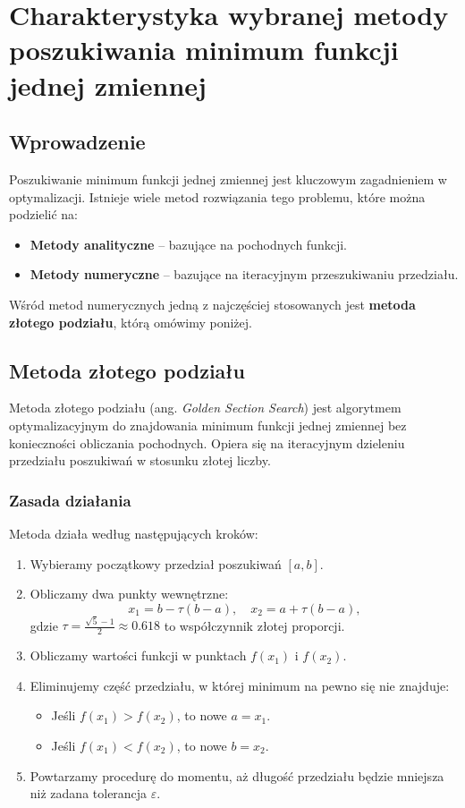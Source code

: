 \section{Charakterystyka wybranej metody poszukiwania minimum funkcji jednej zmiennej}

\subsection{Wprowadzenie}
Poszukiwanie minimum funkcji jednej zmiennej jest kluczowym zagadnieniem w optymalizacji. Istnieje wiele metod rozwiązania tego problemu, które można podzielić na:
\begin{itemize}
    \item \textbf{Metody analityczne} – bazujące na pochodnych funkcji.
    \item \textbf{Metody numeryczne} – bazujące na iteracyjnym przeszukiwaniu przedziału.
\end{itemize}

Wśród metod numerycznych jedną z najczęściej stosowanych jest \textbf{metoda złotego podziału}, którą omówimy poniżej.

\subsection{Metoda złotego podziału}
Metoda złotego podziału (ang. \textit{Golden Section Search}) jest algorytmem optymalizacyjnym do znajdowania minimum funkcji jednej zmiennej bez konieczności obliczania pochodnych. Opiera się na iteracyjnym dzieleniu przedziału poszukiwań w stosunku złotej liczby.

\subsubsection{Zasada działania}
Metoda działa według następujących kroków:

\begin{enumerate}
    \item Wybieramy początkowy przedział poszukiwań \([a, b]\).
    \item Obliczamy dwa punkty wewnętrzne:
    \[
    x_1 = b - \tau (b - a), \quad x_2 = a + \tau (b - a),
    \]
    gdzie \( \tau = \frac{\sqrt{5} - 1}{2} \approx 0.618 \) to współczynnik złotej proporcji.
    \item Obliczamy wartości funkcji w punktach \( f(x_1) \) i \( f(x_2) \).
    \item Eliminujemy część przedziału, w której minimum na pewno się nie znajduje:
    \begin{itemize}
        \item Jeśli \( f(x_1) > f(x_2) \), to nowe \( a = x_1 \).
        \item Jeśli \( f(x_1) < f(x_2) \), to nowe \( b = x_2 \).
    \end{itemize}
    \item Powtarzamy procedurę do momentu, aż długość przedziału będzie mniejsza niż zadana tolerancja \( \varepsilon \).
\end{enumerate}

